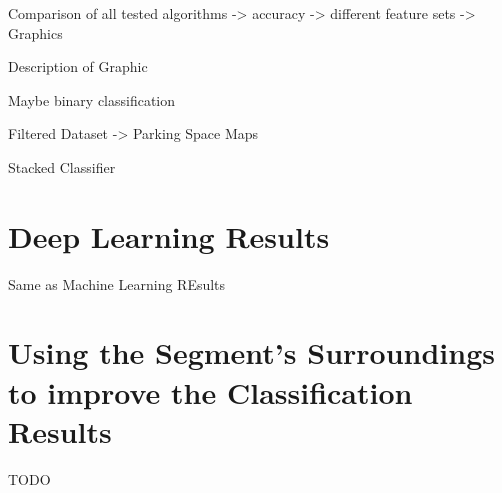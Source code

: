 \begin{table}



\caption{Confusion Matrix.}
\label{table:best_clf_confusion_matrix}
\end{table}


Comparison of all tested algorithms -> accuracy -> different feature sets -> Graphics

Description of Graphic

Maybe binary classification

Filtered Dataset -> Parking Space Maps

Stacked Classifier


\section{Deep Learning Results}
\label{sec:deep_learning_results}

Same as Machine Learning REsults







\section{Using the Segment's Surroundings to improve the Classification Results}

TODO



